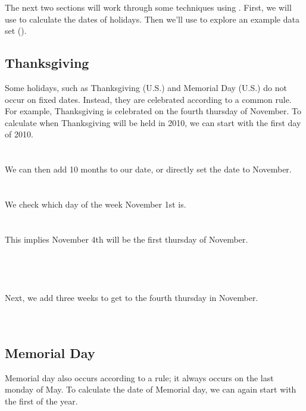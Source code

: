 \documentclass[article]{jss}
\begin{document}
The next two sections will work through some techniques using . First, we will use  to calculate the dates of  holidays. Then we'll use  to explore an example data set ().

\subsection{Thanksgiving}
Some holidays, such as Thanksgiving (U.S.) and Memorial Day (U.S.) do not occur on fixed dates. Instead, they are celebrated according to a common rule. For example, Thanksgiving is celebrated on the fourth thursday of November. To calculate when Thanksgiving will be held in 2010, we can start with the first day of 2010.\\

\\
\\

We can then add 10 months to our date, or directly set the date to November.\\

\\
\\

We check which day of the week November 1st is.\\

\\
\\

This implies November 4th will be the first thursday of November.\\

\\
\\
\\
\\

Next, we add three weeks to get to the fourth thursday in November.\\

\\
\\

\subsection{Memorial Day}
Memorial day also occurs according to a rule; it always occurs on the last monday of May. To calculate the date of Memorial day, we can again start with the first of the year.\\
\end{document}
